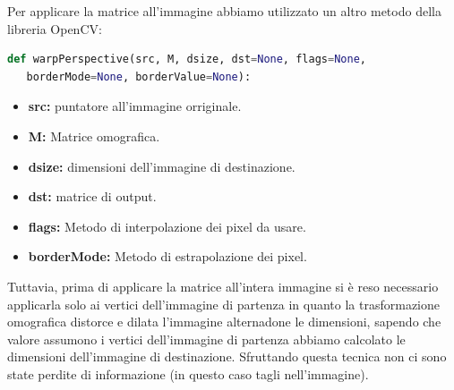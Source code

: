 \documentclass[twoside]{supsistudent}
\begin{document}
Per applicare la matrice all'immagine abbiamo utilizzato un altro metodo della libreria OpenCV: 
\begin{lstlisting}[language=Python]
  def warpPerspective(src, M, dsize, dst=None, flags=None,
   borderMode=None, borderValue=None):
\end{lstlisting}
\begin{itemize}
  \item \textbf{src:} puntatore all'immagine orriginale.
  \item \textbf{M:} Matrice omografica.
  \item \textbf{dsize:} dimensioni dell'immagine di destinazione.
  \item \textbf{dst:} matrice di output.
  \item \textbf{flags:} Metodo di interpolazione dei pixel da usare.
  \item \textbf{borderMode:} Metodo di estrapolazione dei pixel. 
\end{itemize}
Tuttavia, prima di applicare la matrice all'intera immagine si è reso necessario applicarla solo ai vertici dell'immagine di partenza in quanto la 
trasformazione omografica distorce e dilata l'immagine alternadone le dimensioni, sapendo che valore assumono i vertici dell'immagine di partenza abbiamo
calcolato le dimensioni dell'immagine di destinazione. Sfruttando questa tecnica non ci sono state perdite di informazione (in questo caso tagli nell'immagine).
\end{document}
